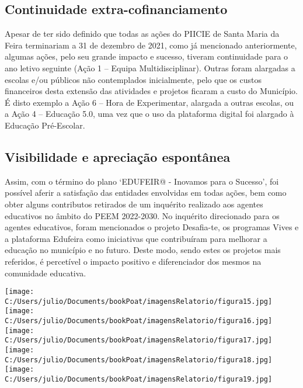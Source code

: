 \documentclass[
]{book}
\begin{document}
\hypertarget{continuidade-extra-cofinanciamento}{%
\subsection{\texorpdfstring{\textbf{Continuidade extra-cofinanciamento}}{Continuidade extra-cofinanciamento}}\label{continuidade-extra-cofinanciamento}}

Apesar de ter sido definido que todas as ações do PIICIE de Santa Maria da Feira terminariam a 31 de dezembro de 2021, como já mencionado anteriormente, algumas ações, pelo seu grande impacto e sucesso, tiveram continuidade para o ano letivo seguinte (Ação 1 -- Equipa Multidisciplinar). Outras foram alargadas a escolas e/ou públicos não contemplados inicialmente, pelo que os custos financeiros desta extensão das atividades e projetos ficaram a custo do Município. É disto exemplo a Ação 6 -- Hora de Experimentar, alargada a outras escolas, ou a Ação 4 -- Educação 5.0, uma vez que o uso da plataforma digital foi alargado à Educação Pré-Escolar.

\hypertarget{visibilidade-e-apreciauxe7uxe3o-espontuxe2nea}{%
\subsection{\texorpdfstring{\textbf{Visibilidade e apreciação espontânea}}{Visibilidade e apreciação espontânea}}\label{visibilidade-e-apreciauxe7uxe3o-espontuxe2nea}}

Assim, com o término do plano `EDUFEIR@ - Inovamos para o Sucesso', foi possível aferir a satisfação das entidades envolvidas em todas ações, bem como obter alguns contributos retirados de um inquérito realizado aos agentes educativos no âmbito do PEEM 2022-2030.
No inquérito direcionado para os agentes educativos, foram mencionados o projeto Desafia-te, os programas Vives e a plataforma Edufeira como iniciativas que contribuíram para melhorar a educação no município e no futuro. Deste modo, sendo estes os projetos mais referidos, é percetível o impacto positivo e diferenciador dos mesmos na comunidade educativa.

\texttt{[image: C:/Users/julio/Documents/bookPoat/imagensRelatorio/figura15.jpg]}
\texttt{[image: C:/Users/julio/Documents/bookPoat/imagensRelatorio/figura16.jpg]}
\texttt{[image: C:/Users/julio/Documents/bookPoat/imagensRelatorio/figura17.jpg]}
\texttt{[image: C:/Users/julio/Documents/bookPoat/imagensRelatorio/figura18.jpg]}
\texttt{[image: C:/Users/julio/Documents/bookPoat/imagensRelatorio/figura19.jpg]}
\end{document}
